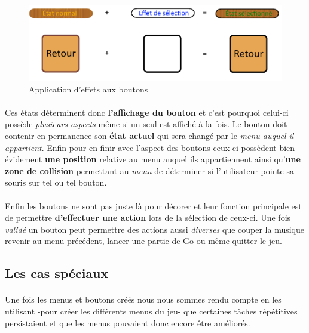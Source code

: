             \begin{figure}[h!]
            \centering
            \includegraphics[scale=0.30]{figures/experiments/Effet_Select.png}
            \caption{Application d'effets aux boutons}
            \label{fig:button}
            \end{figure}
            
            \paragraph{}Ces états déterminent donc \textbf{l’affichage du bouton} et c’est pourquoi celui-ci possède \textit{plusieurs aspects} même si un seul est affiché à la fois. Le bouton doit contenir en permanence son \textbf{état actuel} qui sera changé par le \textit{menu auquel il appartient}. Enfin pour en finir avec l’aspect des boutons ceux-ci possèdent bien évidement \textbf{une position} relative au menu auquel ils appartiennent ainsi qu’\textbf{une zone de collision} permettant au \textit{menu} de déterminer si l’utilisateur pointe sa souris sur tel ou tel bouton.
            
            \paragraph{}Enfin les boutons ne sont pas juste là pour décorer et leur fonction principale est de permettre \textbf{d’effectuer une action} lors de la sélection de ceux-ci. Une fois \textit{validé} un bouton peut permettre des actions aussi \textit{diverses} que couper la musique revenir au menu précédent, lancer une partie de Go ou même quitter le jeu.

        \subsection{Les cas spéciaux}
            \paragraph{}Une fois les menus et boutons créés nous nous sommes rendu compte en les utilisant -pour créer les différents menus du jeu- que certaines tâches répétitives persistaient et que les menus pouvaient donc encore être améliorés. 
            
